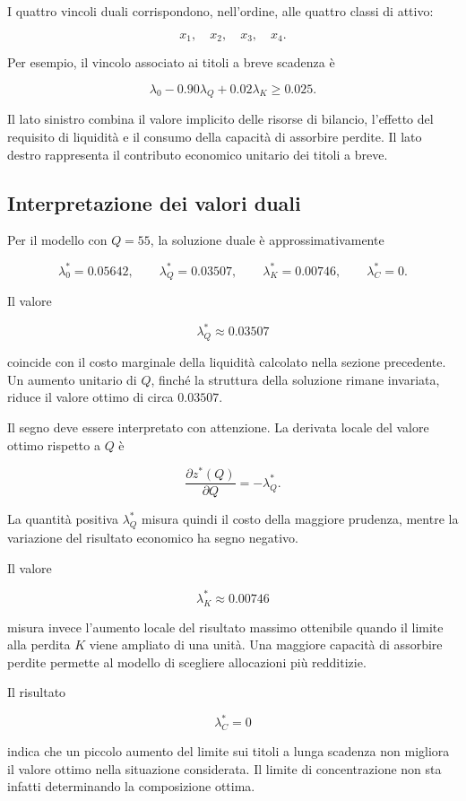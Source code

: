 I quattro vincoli duali corrispondono, nell'ordine, alle quattro classi di
attivo:

\[
x_1,\quad x_2,\quad x_3,\quad x_4.
\]

Per esempio, il vincolo associato ai titoli a breve scadenza \`{e}

\[
\lambda_0
-
0.90\lambda_Q
+
0.02\lambda_K
\geq
0.025.
\]

Il lato sinistro combina il valore implicito delle risorse di bilancio,
l'effetto del requisito di liquidit\`{a} e il consumo della capacit\`{a} di
assorbire perdite. Il lato destro rappresenta il contributo economico unitario
dei titoli a breve.

\subsection{Interpretazione dei valori duali}

Per il modello con \(Q=55\), la soluzione duale \`{e} approssimativamente

\[
\lambda_0^*
=
0.05642,
\qquad
\lambda_Q^*
=
0.03507,
\qquad
\lambda_K^*
=
0.00746,
\qquad
\lambda_C^*
=
0.
\]

Il valore

\[
\lambda_Q^*
\approx
0.03507
\]

\noindent coincide con il costo marginale della liquidit\`{a} calcolato nella sezione
precedente. Un aumento unitario di \(Q\), finch\'{e} la struttura della
soluzione rimane invariata, riduce il valore ottimo di circa \(0.03507\).

Il segno deve essere interpretato con attenzione. La derivata locale del
valore ottimo rispetto a \(Q\) \`{e}

\[
\frac{\partial z^*(Q)}{\partial Q}
=
-\lambda_Q^*.
\]

La quantit\`{a} positiva \(\lambda_Q^*\) misura quindi il costo della maggiore
prudenza, mentre la variazione del risultato economico ha segno negativo.

Il valore

\[
\lambda_K^*
\approx
0.00746
\]

\noindent misura invece l'aumento locale del risultato massimo ottenibile quando il
limite alla perdita \(K\) viene ampliato di una unit\`{a}. Una maggiore
capacit\`{a} di assorbire perdite permette al modello di scegliere
allocazioni pi\`{u} redditizie.

Il risultato

\[
\lambda_C^*=0
\]

\noindent indica che un piccolo aumento del limite sui titoli a lunga scadenza non
migliora il valore ottimo nella situazione considerata. Il limite di
concentrazione non sta infatti determinando la composizione ottima.

